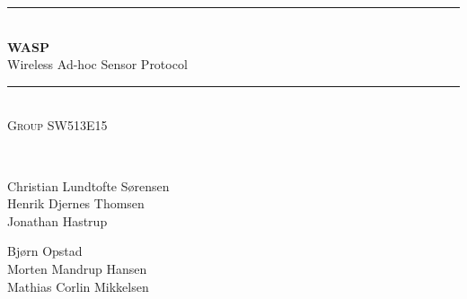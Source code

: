 \documentclass[pdftex,12pt,a4paper]{report}
\newcommand{\HRule}{\rule{\linewidth}{0.5mm}}
\begin{document}
\begin{titlepage}
\begin{center}


\HRule \\[0.4cm]
{ \huge{\bfseries WASP}\\ Wireless Ad-hoc Sensor Protocol\\[0.4cm] }

\HRule \\[1.5cm]

\textsc{Group SW513E15}

\begin{figure}[!h]
	\centering
\end{figure}

\textsc{\Large }\\[0.5cm]

\begin{minipage}{0.46\textwidth}
\begin{flushleft} \large
Christian Lundtofte Sørensen\\
Henrik Djernes Thomsen\\
Jonathan Hastrup\\
\end{flushleft}
\end{minipage}
\begin{minipage}{0.45\textwidth}
\begin{flushright} \large
Bjørn Opstad\\
Morten Mandrup Hansen\\
Mathias Corlin Mikkelsen
\end{flushright}
\end{minipage}

\vfill

\end{center}
\end{titlepage}
\end{document}
